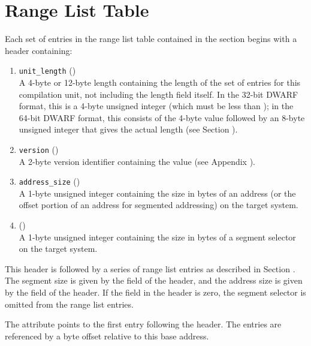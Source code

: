 \section{Range List Table}
\label{app:rangelisttable}
Each set of entries in the range list table contained in the
\dotdebugranges{} section begins with a header containing:
\begin{enumerate}[1. ]
\item \texttt{unit\_length} () \\
A 4-byte or 12-byte length containing the length of
the set of entries for this compilation unit, not
including the length field itself. In the 32-bit
DWARF format, this is a 4-byte unsigned integer
(which must be less than \xfffffffzero); in the 64-bit
DWARF format, this consists of the 4-byte value
\wffffffff followed by an 8-byte unsigned integer
that gives the actual length (see 
Section ).

\item  \texttt{version} (\HFTuhalf) \\
A 2-byte version identifier containing the value
\versiondotdebugranges{} 
(see Appendix ).

\item	\texttt{address\_size} (\HFTubyte) \\
A 1-byte unsigned integer containing the size in
bytes of an address (or the offset portion of an
address for segmented addressing) on the target
system.

\item	\HFNsegmentselectorsize{} (\HFTubyte) \\
A 1-byte unsigned integer containing the size in
bytes of a segment selector on the target system.
\end{enumerate}

This header is followed by a series of range list entries as
described in Section .
The segment size is given by the
\HFNsegmentselectorsize{} field of the header, and the address size is
given by the  field of the header. If the
\HFNsegmentselectorsize{} field in the header is zero, the segment
selector is omitted from the range list entries.

The \DWATrangesbase{} attribute points to the first entry
following the header. The entries are referenced by a byte
offset relative to this base address.

